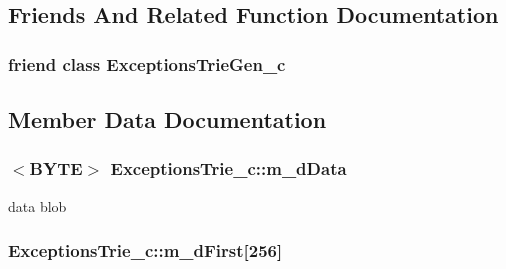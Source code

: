 \subsection{Friends And Related Function Documentation}
\hypertarget{classExceptionsTrie__c_a824c99a12cb6475c31a4a450c7337e64}{
\subsubsection[{Exceptions\-Trie\-Gen\-\_\-c}]{\setlength{\rightskip}{0pt plus 5cm}friend class {\bf Exceptions\-Trie\-Gen\-\_\-c}\hspace{0.3cm}{\ttfamily [friend]}}}\label{classExceptionsTrie__c_a824c99a12cb6475c31a4a450c7337e64}


\subsection{Member Data Documentation}
\hypertarget{classExceptionsTrie__c_ad345df1e9df368e943698c49142972eb}{
\subsubsection[{m\-\_\-d\-Data}]{$<${\bf B\-Y\-T\-E}$>$ Exceptions\-Trie\-\_\-c\-::m\-\_\-d\-Data\hspace{0.3cm}{\ttfamily [protected]}}}\label{classExceptionsTrie__c_ad345df1e9df368e943698c49142972eb}


data blob 

\hypertarget{classExceptionsTrie__c_af5ef1a96af3696fd67c25f98966fb132}{
\subsubsection[{m\-\_\-d\-First}]{ Exceptions\-Trie\-\_\-c\-::m\-\_\-d\-First\mbox{[}256\mbox{]}\hspace{0.3cm}{\ttfamily [protected]}}}\label{classExceptionsTrie__c_af5ef1a96af3696fd67c25f98966fb132}


